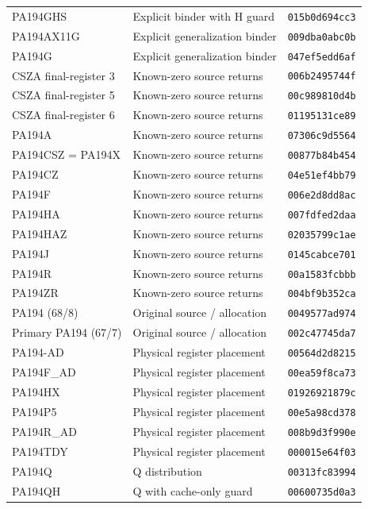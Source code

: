 \begin{longtable}{p{43mm}p{73mm}p{25mm}}
PA194GHS & Explicit binder with H guard & \texttt{015b0d694cc3}\\
PA194AX11G & Explicit generalization binder & \texttt{009dba0abc0b}\\
PA194G & Explicit generalization binder & \texttt{047ef5edd6af}\\
CSZA final-register 3 & Known-zero source returns & \texttt{006b2495744f}\\
CSZA final-register 5 & Known-zero source returns & \texttt{00c989810d4b}\\
CSZA final-register 6 & Known-zero source returns & \texttt{01195131ce89}\\
PA194A & Known-zero source returns & \texttt{07306c9d5564}\\
PA194CSZ = PA194X & Known-zero source returns & \texttt{00877b84b454}\\
PA194CZ & Known-zero source returns & \texttt{04e51ef4bb79}\\
PA194F & Known-zero source returns & \texttt{006e2d8dd8ac}\\
PA194HA & Known-zero source returns & \texttt{007fdfed2daa}\\
PA194HAZ & Known-zero source returns & \texttt{02035799c1ae}\\
PA194J & Known-zero source returns & \texttt{0145cabce701}\\
PA194R & Known-zero source returns & \texttt{00a1583fcbbb}\\
PA194ZR & Known-zero source returns & \texttt{004bf9b352ca}\\
PA194 (68/8) & Original source / allocation & \texttt{0049577ad974}\\
Primary PA194 (67/7) & Original source / allocation & \texttt{002c47745da7}\\
PA194-AD & Physical register placement & \texttt{00564d2d8215}\\
PA194F\_AD & Physical register placement & \texttt{00ea59f8ca73}\\
PA194HX & Physical register placement & \texttt{01926921879c}\\
PA194P5 & Physical register placement & \texttt{00e5a98cd378}\\
PA194R\_AD & Physical register placement & \texttt{008b9d3f990e}\\
PA194TDY & Physical register placement & \texttt{000015e64f03}\\
PA194Q & Q distribution & \texttt{00313fc83994}\\
PA194QH & Q with cache-only guard & \texttt{00600735d0a3}\\

\end{longtable}
